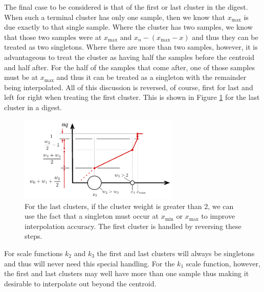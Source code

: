 \documentclass[]{statsoc}
\begin{document}
The final case to be considered is that of the first or last cluster in the digest. 
When such a terminal cluster has only one sample, then we know that $x_{\mathrm {max}}$ is due exactly to that single sample. Where the cluster has two samples, we know that those two samples were at $x_{\mathrm {max}}$ and $x_n-(x_{\mathrm {max}}-x)$ and thus they can be treated as two singletons. Where there are more than two samples, however, it is advantageous to treat the cluster as having half the samples before the centroid and half after. For the half of the samples that come after, one of those samples must be at $x_{\mathrm {max}}$ and thus it can be treated as a singleton with the remainder being interpolated. All of this discussion is reversed, of course, first for last and left for right when treating the first cluster. This is shown in Figure \ref{fig:endpoint} for the last cluster in a digest.
\begin{figure}[htb] %
   \centering
   \includegraphics[width=3in]{quantile-figures/endpoint.pdf} 
   \caption{For the last clusters, if the cluster weight is greater than $2$, we can use the fact that a singleton must occur at $x_{\mathrm {min}}$ or $x_{\mathrm {max}}$ to improve interpolation accuracy. The first cluster is handled by reversing these steps.}
   \label{fig:endpoint}
\end{figure}

For scale functions $k_2$ and $k_3$ the first and last clusters will always be singletons and thus will never need this special handling. For the $k_1$ scale function, however, the first and last clusters may well have more than one sample thus making it desirable to interpolate out beyond the centroid. 
\end{document}

